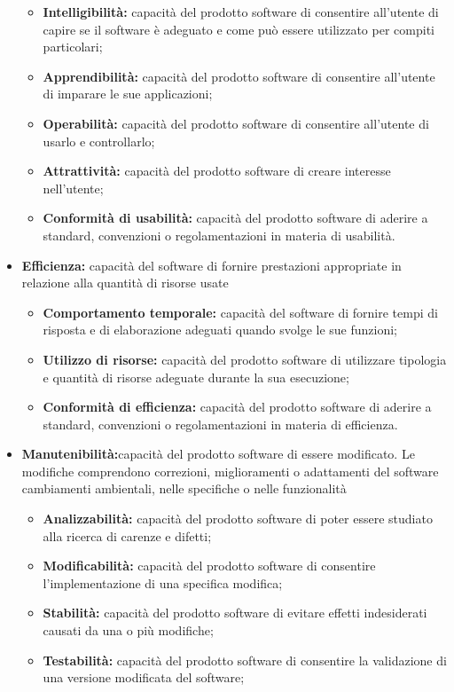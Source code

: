 \documentclass[12pt,a4paper]{article}
\begin{document}
\begin{itemize}
\begin{itemize}
		\item \textbf{Intelligibilità:} capacità del prodotto software di consentire all'utente di capire se il software è adeguato e come può essere utilizzato per compiti	particolari;
		\item \textbf{Apprendibilità:} capacità del prodotto software di consentire all'utente di imparare le sue applicazioni;
		\item \textbf{Operabilità:} capacità del prodotto software di consentire all'utente di usarlo e controllarlo;
		\item \textbf{Attrattività:} capacità del prodotto software di creare interesse nell'utente;
		\item \textbf{Conformità di usabilità:} capacità del prodotto software di aderire a standard, convenzioni o regolamentazioni in materia di usabilità.
	\end{itemize}
	\item \textbf{Efficienza:} capacità del software di fornire prestazioni appropriate in relazione alla quantità di risorse usate
	\begin{itemize}
		\item \textbf{Comportamento temporale:} capacità del software di fornire tempi di risposta e di elaborazione adeguati quando svolge le sue funzioni;
		\item \textbf{Utilizzo di risorse:} capacità del prodotto software di utilizzare tipologia e quantità di risorse adeguate durante la sua esecuzione;
		\item \textbf{ Conformità di efficienza: } capacità del prodotto software di aderire a standard, convenzioni o regolamentazioni in materia di efficienza.
	\end{itemize}
	\item \textbf{Manutenibilità:}capacità del prodotto software di essere modificato. Le modifiche comprendono correzioni, miglioramenti o adattamenti del software cambiamenti ambientali, nelle specifiche o nelle funzionalità
	\begin{itemize}
		\item \textbf{Analizzabilità:} capacità del prodotto software di poter essere studiato alla ricerca di carenze e difetti;
		\item \textbf{Modificabilità: }capacità del prodotto software di consentire l'implementazione di una specifica modifica;
		\item \textbf{ Stabilità:} capacità del prodotto software di evitare effetti indesiderati causati da una o più modifiche;
		\item \textbf{Testabilità:} capacità del prodotto software di consentire la validazione di	una versione modificata del software;

\end{itemize}
\end{itemize}
\end{document}
